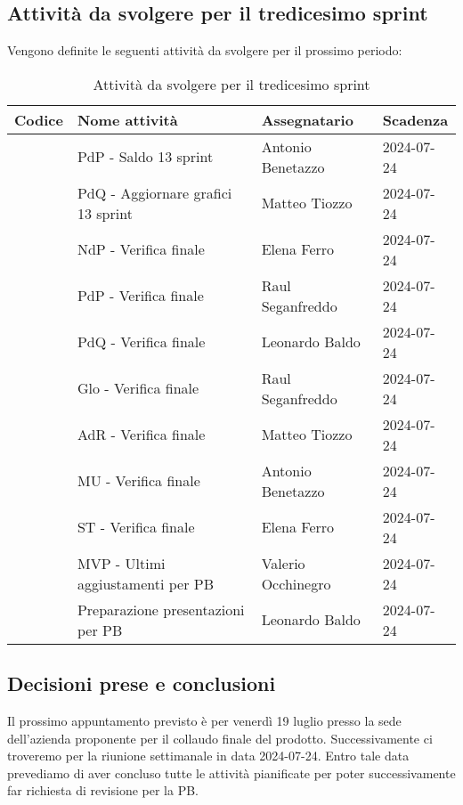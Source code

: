 \documentclass[italian,12pt]{article}
\begin{document}
\newpage

\subsection{Attività da svolgere per il tredicesimo sprint}
Vengono definite le seguenti attività da svolgere per il prossimo periodo:
\begin{table}[!h]
	\centering
	\begin{tabular}{ |l||p{7cm}|l|l| }
		\hline
		\textbf{Codice}    & \textbf{Nome attività}                           & \textbf{Assegnatario} & \textbf{Scadenza} \\
		\hline
		\mySkip[86bz8e6dg] & PdP - Saldo 13 sprint                            & Antonio Benetazzo     & 2024-07-24        \\
		\mySkip[86bzjkpg8] & PdQ - Aggiornare grafici 13 sprint               & Matteo Tiozzo         & 2024-07-24        \\
		\mySkip[86bz0pdgd] & NdP - Verifica finale                            & Elena Ferro           & 2024-07-24        \\
		\mySkip[86bz0pdm7] & PdP - Verifica finale                            & Raul Seganfreddo      & 2024-07-24        \\
		\mySkip[86bz0pdr2] & PdQ - Verifica finale                            & Leonardo Baldo        & 2024-07-24        \\
		\mySkip[86by7xhag] & Glo - Verifica finale                            & Raul Seganfreddo      & 2024-07-24        \\
		\mySkip[86by7xgpm] & AdR - Verifica finale                            & Matteo Tiozzo         & 2024-07-24        \\
		\mySkip[86bz0pdby] & MU - Verifica finale                             & Antonio Benetazzo     & 2024-07-24        \\
		\mySkip[86bz0pfh2] & ST - Verifica finale                             & Elena Ferro           & 2024-07-24        \\
		\mySkip[86by7xgyw] & MVP - Ultimi aggiustamenti per PB                & Valerio Occhinegro    & 2024-07-24        \\
		\mySkip[86bz0pmpe] & Preparazione presentazioni per PB                & Leonardo Baldo        & 2024-07-24        \\
		\hline
	\end{tabular}
	\caption{Attività da svolgere per il tredicesimo sprint}
\end{table}

\subsection{Decisioni prese e conclusioni}
Il prossimo appuntamento previsto è per venerdì 19 luglio presso la sede dell'azienda proponente per il collaudo finale del prodotto. Successivamente ci troveremo per la riunione settimanale in data 2024-07-24. Entro tale data prevediamo di aver concluso tutte le attività pianificate per poter successivamente far richiesta di revisione per la PB.
\end{document}
